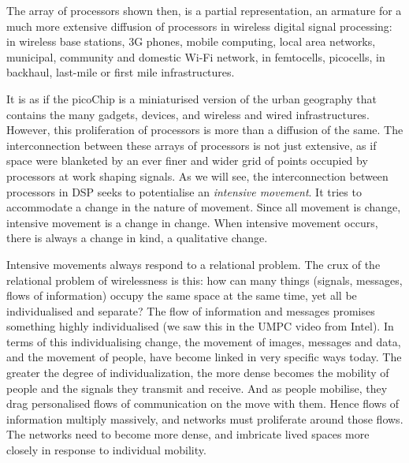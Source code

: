 

The array of processors shown then, is a partial representation, an armature for a much more extensive diffusion of
processors in wireless digital signal processing: in wireless base
stations, 3G phones, mobile computing, local area networks, municipal,
community and domestic Wi{}-Fi network, in femtocells, picocells, in
backhaul, last{}-mile or first mile infrastructures.


It is as if the picoChip is a miniaturised version of the urban
geography that contains the many gadgets, devices, and wireless and
wired infrastructures. However, this proliferation of processors is
more than a diffusion of the same. The interconnection between these
arrays of processors is not just extensive, as if space were blanketed
by an ever finer and wider grid of points occupied by processors at
work shaping signals. As we will see, the interconnection between
processors in DSP seeks to potentialise an {\em intensive movement}.
It tries to accommodate a change in the nature of movement. Since all
movement is change, intensive movement is a change in change. When
intensive movement occurs, there is always a change in kind, a
qualitative change.


Intensive movements always respond to a relational problem. The crux of
the relational problem of wirelessness is this: how can many things
(signals, messages, flows of information) occupy the same space at the
same time, yet all be individualised and separate? The flow of
information and messages promises something highly individualised (we
saw this in the UMPC video from Intel). In terms of this
individualising change, the movement of images, messages and data, and
the movement of people, have become linked in very specific ways today.
The greater the degree of individualization, the more dense becomes the
mobility of people and the signals they transmit and receive. And as
people mobilise, they drag personalised flows of communication on the
move with them. Hence flows of information multiply massively, and
networks must proliferate around those flows. The networks need to
become more dense, and imbricate lived spaces more closely in response
to individual mobility. 

